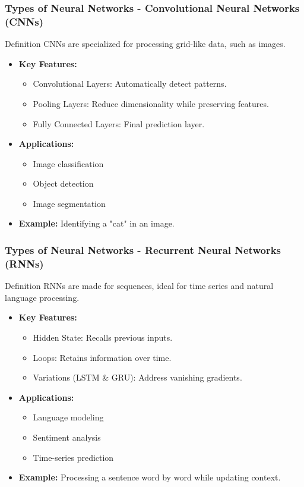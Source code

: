 \documentclass[aspectratio=169]{beamer}
\begin{document}
\begin{frame}[fragile]
    \frametitle{Types of Neural Networks - Convolutional Neural Networks (CNNs)}
    \begin{block}{Definition}
        CNNs are specialized for processing grid-like data, such as images.
    \end{block}
    \begin{itemize}
        \item \textbf{Key Features:}
        \begin{itemize}
            \item Convolutional Layers: Automatically detect patterns.
            \item Pooling Layers: Reduce dimensionality while preserving features.
            \item Fully Connected Layers: Final prediction layer.
        \end{itemize}
        \item \textbf{Applications:}
        \begin{itemize}
            \item Image classification
            \item Object detection
            \item Image segmentation
        \end{itemize}
        \item \textbf{Example:} Identifying a "cat" in an image.
    \end{itemize}
\end{frame}

\begin{frame}[fragile]
    \frametitle{Types of Neural Networks - Recurrent Neural Networks (RNNs)}
    \begin{block}{Definition}
        RNNs are made for sequences, ideal for time series and natural language processing.
    \end{block}
    \begin{itemize}
        \item \textbf{Key Features:}
        \begin{itemize}
            \item Hidden State: Recalls previous inputs.
            \item Loops: Retains information over time.
            \item Variations (LSTM & GRU): Address vanishing gradients.
        \end{itemize}
        \item \textbf{Applications:}
        \begin{itemize}
            \item Language modeling
            \item Sentiment analysis
            \item Time-series prediction
        \end{itemize}
        \item \textbf{Example:} Processing a sentence word by word while updating context.
    \end{itemize}
\end{frame}
\end{document}
